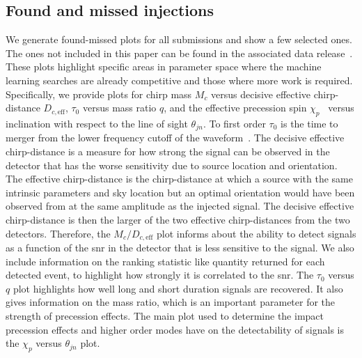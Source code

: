\subsection{Found and missed injections}
We generate found-missed plots for all submissions and show a few selected ones. The ones not included in this paper can be found in the associated data release~\cite{github}. These plots highlight specific areas in parameter space where the machine learning searches are already competitive and those where more work is required. Specifically, we provide plots for chirp mass $M_c$ versus decisive effective chirp-distance $D_{c,\text{eff}}$, $\tau_0$ versus mass ratio $q$, and the effective precession spin $\chi_p$~\cite{Schmidt:2014iyl} versus inclination with respect to the line of sight $\theta_{jn}$. To first order $\tau_0$ is the time to merger from the lower frequency cutoff of the waveform~\cite{Cokelaer:2007kx, Maggiore:2008aaa}. The decisive effective chirp-distance is a measure for how strong the signal can be observed in the detector that has the worse sensitivity due to source location and orientation. The effective chirp-distance is the chirp-distance at which a source with the same intrinsic parameters and sky location but an optimal orientation would have been observed from at the same amplitude as the injected signal. The decisive effective chirp-distance is then the larger of the two effective chirp-distances from the two detectors. Therefore, the $M_c/D_{c,\text{eff}}$ plot informs about the ability to detect signals as a function of the \acrshort{snr} in the detector that is less sensitive to the signal. We also include information on the ranking statistic like quantity returned for each detected event, to highlight how strongly it is correlated to the \acrshort{snr}. The $\tau_0$ versus $q$ plot highlights how well long and short duration signals are recovered. It also gives information on the mass ratio, which is an important parameter for the strength of precession effects. The main plot used to determine the impact precession effects and higher order modes have on the detectability of signals is the $\chi_p$ versus $\theta_{jn}$ plot.

